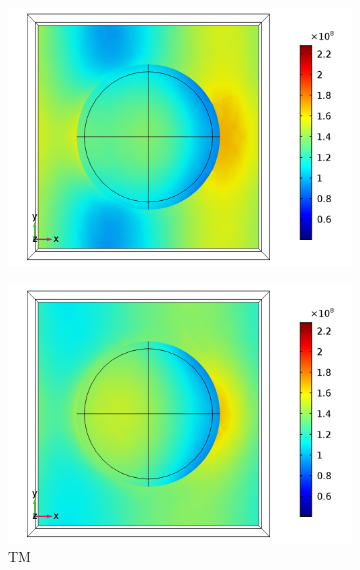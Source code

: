\begin{figure}[htb!]
   
    \begin{subfigure}{0.32\textwidth}
        \centering
        \includegraphics[width=\linewidth]{figures/ch4/S5A/FieldDistribution/Sample5A_TM_Slice@z=-05t_wl=390_notitle.png}
   \end{subfigure}
   \begin{subfigure}{0.32\textwidth}
        \centering
        \includegraphics[width=\linewidth]{figures/ch4/S5A/FieldDistribution/Sample5A_TM_Slice@z=-05t_wl=450_notitle.png}
        \caption{TM}
        \vspace{-0.7cm}
   \end{subfigure}   
   \begin{subfigure}{0.32\textwidth}

\end{subfigure}
\end{figure}
